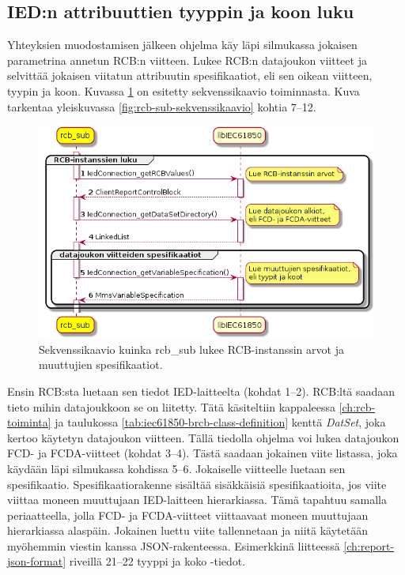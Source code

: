 \subsection{IED:n attribuuttien tyyppin ja koon luku}
Yhteyksien muodostamisen jälkeen ohjelma käy läpi silmukassa jokaisen parametrina annetun RCB:n viitteen. Lukee RCB:n datajoukon viitteet ja selvittää jokaisen viitatun attribuutin spesifikaatiot, eli sen oikean viitteen, tyypin ja koon. Kuvassa \ref{fig:rcb-sub-reading-specifications} on esitetty sekvenssikaavio toiminnasta. Kuva tarkentaa yleiskuvassa \ref{fig:rcb-sub-sekvenssikaavio} kohtia 7--12.

\begin{figure}[ht!]
	\includegraphics[width=1\textwidth]{pictures/rcb-sub-reading-specifications.png}
	\caption{Sekvenssikaavio kuinka rcb\_sub lukee RCB-instanssin arvot ja muuttujien spesifikaatiot.}
	\label{fig:rcb-sub-reading-specifications}
\end{figure}

Ensin RCB:sta luetaan sen tiedot IED-laitteelta (kohdat 1--2). RCB:ltä saadaan tieto mihin datajoukkoon se on liitetty. Tätä käsiteltiin kappaleessa \ref{ch:rcb-toiminta} ja taulukossa \ref{tab:iec61850-brcb-class-definition} kenttä \emph{DatSet}, joka kertoo käytetyn datajoukon viitteen. Tällä tiedolla ohjelma voi lukea datajoukon FCD- ja FCDA-viitteet (kohdat 3--4). Tästä saadaan jokainen viite listassa, joka käydään läpi silmukassa kohdissa 5--6. Jokaiselle viitteelle luetaan sen spesifikaatio. Spesifikaatiorakenne sisältää sisäkkäisiä spesifikaatioita, jos viite viittaa moneen muuttujaan IED-laitteen hierarkiassa. Tämä tapahtuu samalla periaatteella, jolla FCD- ja FCDA-viitteet viittaavaat moneen muuttujaan hierarkiassa alaspäin. Jokainen luettu viite tallennetaan ja niitä käytetään myöhemmin viestin kanssa JSON-rakenteessa. Esimerkkinä liitteessä \ref{ch:report-json-format} riveillä 21--22 tyyppi ja koko -tiedot.


